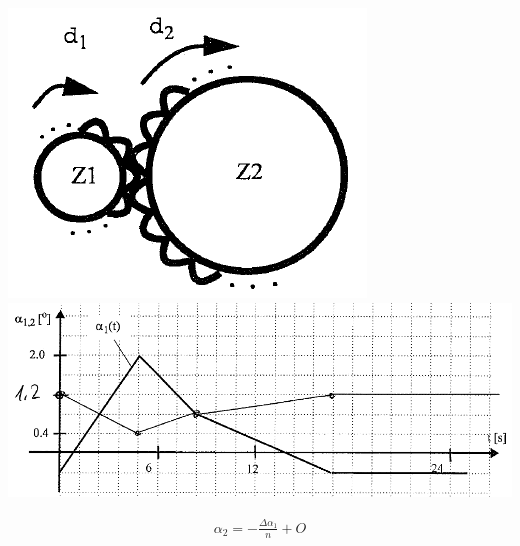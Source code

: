 \begin{center}
	\begin{minipage}{0.35\textwidth}
		\begin{center}
			\includegraphics[width=0.25\linewidth,keepaspectratio=true]{Images/zahnrad_II}
			\includegraphics[width=0.5\linewidth,keepaspectratio=true]{Images/zahnrad_II2}
		\end{center}
	\end{minipage}%
	\begin{minipage}{0.15\textwidth}
		\begin{align*}
			\alpha_2 = -\frac{\Delta\alpha_1}{n} + O
		\end{align*}
	\end{minipage}
\end{center}

